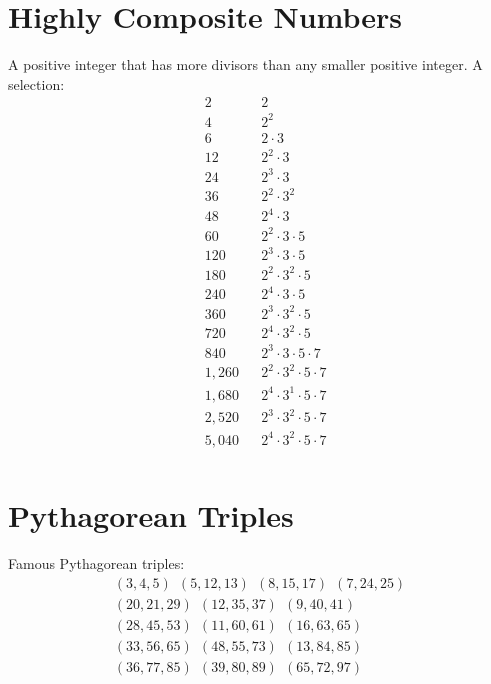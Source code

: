 \documentclass[12pt]{article}
\begin{document}
\section*{Highly Composite Numbers}
A positive integer that has more divisors than any smaller positive integer. A selection:
\begin{align*}
& 2            &&	2\\
& 4 	         && 2^{2}\\
& 6            && 2 \cdot 3\\
& 12           && 2^{2} \cdot 3\\
& 24 	         && 2^{3} \cdot 3 \\
& 36 	         && 2^{2} \cdot 3^{2} \\
& 48 	         && 2^{4} \cdot 3 \\
& 60	         && 2^{2} \cdot 3 \cdot 5\\
& 120          && 2^{3} \cdot 3 \cdot 5\\
& 180          && 2^{2} \cdot 3^{2} \cdot 5\\
& 240 	       && 2^{4} \cdot 3 \cdot 5\\
& 360          && 2^{3} \cdot 3^{2} \cdot 5\\
& 720 	       && 2^{4} \cdot 3^{2} \cdot 5\\
& 840 	       && 2^{3} \cdot 3 \cdot 5 \cdot 7\\
& 1,260 	     && 2^{2} \cdot 3^{2} \cdot 5 \cdot 7\\
& 1,680 	     && 2^{4} \cdot 3^{1} \cdot 5 \cdot 7\\
& 2,520        && 2^{3} \cdot 3^{2} \cdot 5 \cdot 7\\
& 5,040        && 2^{4} \cdot 3^{2} \cdot 5 \cdot 7\\
\end{align*}


\section*{Pythagorean Triples}
Famous Pythagorean triples: 
\begin{align*}
(3, 4, 5)~~
(5, 12, 13)~~
(8, 15, 17)~~
(7, 24, 25)\\
(20, 21, 29)~~	
(12, 35, 37)~~	
(9, 40, 41)\\ 	
(28, 45, 53)~~
(11, 60, 61)~~ 
(16, 63, 65)\\
(33, 56, 65)~~ 	
(48, 55, 73)~~
(13, 84, 85)\\
(36, 77, 85)~~
(39, 80, 89)~~
(65, 72, 97) 
\end{align*}
\end{document}
